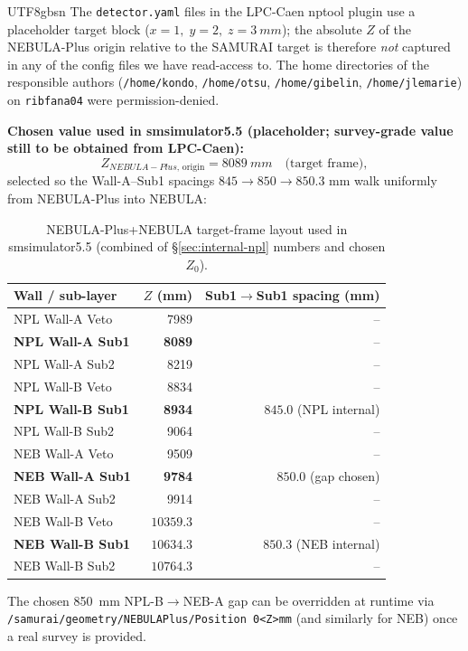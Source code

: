 \documentclass[11pt,a4paper]{article}
\newcommand{\NEB}{NEBULA}
\newcommand{\NPL}{NEBULA-Plus}
\begin{document}
\begin{CJK}{UTF8}{gbsn}
The \texttt{detector.yaml} files in the LPC-Caen nptool plugin use a placeholder
target block ($x=1,\;y=2,\;z=\SI{3}{mm}$); the absolute $Z$ of the \NPL{} origin
relative to the SAMURAI target is therefore \emph{not} captured in any of the
config files we have read-access to. The home directories of the responsible
authors (\texttt{/home/kondo}, \texttt{/home/otsu}, \texttt{/home/gibelin},
\texttt{/home/jlemarie}) on \texttt{ribfana04} were permission-denied.

\textbf{Chosen value used in smsimulator5.5 (placeholder; survey-grade value still
to be obtained from LPC-Caen):}
\[
Z_{\NPL{},\,\text{origin}} = \SI{8089}{mm}\quad\text{(target frame)},
\]
selected so the Wall-A--Sub1 spacings $845 \to 850 \to 850.3$ mm walk uniformly
from \NPL{} into \NEB{}:

\begin{table}[h]
\centering
\caption{\NPL{}+\NEB{} target-frame layout used in smsimulator5.5
(combined of \S\ref{sec:internal-npl} numbers and chosen $Z_0$).}
\begin{tabular}{lrr}
\toprule
Wall / sub-layer & $Z$ (mm) & Sub1$\to$Sub1 spacing (mm)\\
\midrule
NPL Wall-A Veto                 & 7989  & --\\
\textbf{NPL Wall-A Sub1}        & \textbf{8089}  & --\\
NPL Wall-A Sub2                 & 8219  & --\\
NPL Wall-B Veto                 & 8834  & --\\
\textbf{NPL Wall-B Sub1}        & \textbf{8934}  & $845.0$ (NPL internal)\\
NPL Wall-B Sub2                 & 9064  & --\\
NEB Wall-A Veto                 & 9509  & --\\
\textbf{NEB Wall-A Sub1}        & \textbf{9784}  & $850.0$ (gap chosen)\\
NEB Wall-A Sub2                 & 9914  & --\\
NEB Wall-B Veto                 & $10359.3$ & --\\
\textbf{NEB Wall-B Sub1}        & $\mathbf{10634.3}$ & $850.3$ (NEB internal)\\
NEB Wall-B Sub2                 & $10764.3$ & --\\
\bottomrule
\end{tabular}
\end{table}

The chosen \SI{850}{mm} NPL-B$\to$NEB-A gap can be overridden at runtime via
\texttt{/samurai/geometry/NEBULAPlus/Position 0\;<Z>\;mm} (and similarly
for NEB) once a real survey is provided.


\end{CJK}
\end{document}
